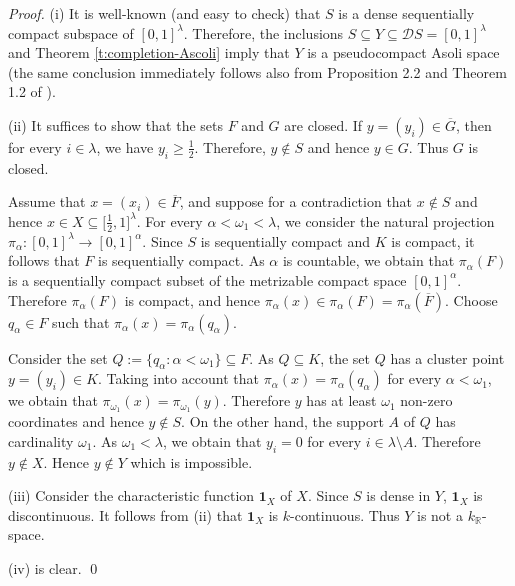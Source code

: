 \documentclass[preprint,11pt]{elsarticle}
\numberwithin{equation}{section}
\numberwithin{theorem}{section}
\newcommand{\w}{\omega}
\newcommand{\IR}{\mathbb{R}}
\newcommand{\DD}{\mathcal{D}}
\newcommand{\SM}{{\setminus}}
\begin{document}
\begin{proof}
(i) It is well-known (and easy to check) that $S$ is a dense sequentially compact subspace of $[0,1]^\lambda$. Therefore, the inclusions $S\subseteq Y\subseteq \DD S=[0,1]^\lambda$ and Theorem \ref{t:completion-Ascoli} imply that  $Y$ is a pseudocompact Asoli space (the same conclusion immediately follows also from Proposition 2.2 and Theorem 1.2 of  \cite{Gabr-pseudo-Ascoli}).
\smallskip

(ii) It suffices to show that the sets $F$ and $G$ are closed.
If $y=(y_i)\in \overline{G}$, then for every $i\in\lambda$, we have $y_i\geq \tfrac{1}{2}$. Therefore, $y\not\in S$ and hence $y\in G$. Thus $G$ is closed.

Assume that $x=(x_i)\in \overline{F}$, and suppose for a contradiction that $x\not\in S$ and hence $x\in X\subseteq \big[\tfrac{1}{2},1\big]^\lambda$.  For every $\alpha<\w_1 <\lambda$, we consider  the natural projection $\pi_\alpha:[0,1]^\lambda \to [0,1]^\alpha$. Since $S$ is sequentially compact and $K$ is compact, it follows that $F$ is sequentially compact. As $\alpha$ is countable, we obtain that $\pi_\alpha(F)$ is a sequentially compact subset of the metrizable compact space $[0,1]^\alpha$. Therefore $\pi_\alpha(F)$ is compact, and hence $\pi_\alpha(x)\in \pi_\alpha(F)=\pi_\alpha(\overline{F})$. Choose $q_\alpha\in F$ such that $\pi_\alpha(x)=\pi_\alpha(q_\alpha)$.

Consider the set $Q:=\{q_\alpha: \alpha<\w_1\}\subseteq F$. As $Q\subseteq K$, the set $Q$ has a cluster point $y=(y_i)\in K$. Taking into account that $\pi_\alpha(x)=\pi_\alpha(q_\alpha)$ for every $\alpha<\w_1$, we obtain that $\pi_{\w_1}(x)=\pi_{\w_1}(y)$. Therefore $y$ has at least $\w_1$ non-zero coordinates and hence $y\not\in S$. On the other hand, the support $A$ of $Q$ has cardinality $\w_1$. As $\w_1 <\lambda$, we obtain that $y_i=0$ for every $i\in\lambda\SM A$. Therefore $y\not\in X$. Hence $y\not\in Y$ which is impossible.
\smallskip

(iii) Consider the characteristic function $\mathbf{1}_{X}$ of $X$. Since $S$ is dense in $Y$,  $\mathbf{1}_{X}$ is discontinuous. It follows from (ii) that  $\mathbf{1}_{X}$ is $k$-continuous.  Thus $Y$ is not a $k_\IR$-space.

(iv) is clear. \qed
\end{proof}
\end{document}
